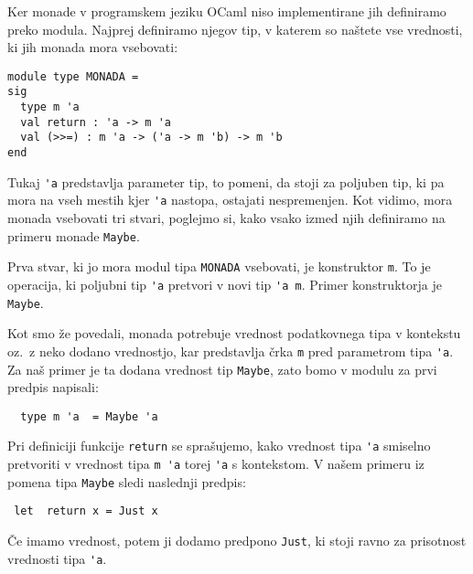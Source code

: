 \documentclass[a4paper,12pt]{article}
\theoremstyle{definition} %
\begin{document}
Ker monade v programskem jeziku OCaml niso implementirane jih definiramo preko modula. Najprej definiramo njegov tip, v katerem so naštete vse vrednosti, ki jih monada mora vsebovati:
\begin{lstlisting}
module type MONADA =
sig
  type m 'a
  val return : 'a -> m 'a
  val (>>=) : m 'a -> ('a -> m 'b) -> m 'b
end
\end{lstlisting}
Tukaj \lstinline{'a} predstavlja parameter tip, to pomeni, da stoji za poljuben tip, ki pa mora na vseh mestih kjer \lstinline{'a} nastopa, ostajati nespremenjen. Kot vidimo, mora monada vsebovati tri stvari, poglejmo si, kako vsako izmed njih definiramo na primeru monade \lstinline{Maybe}.

Prva stvar, ki jo mora modul tipa \lstinline{MONADA} vsebovati, je konstruktor \lstinline{m}. To je operacija, ki poljubni tip \lstinline{'a} pretvori v novi tip \lstinline{'a m}. Primer konstruktorja je \lstinline{Maybe}.

Kot smo že povedali, monada potrebuje vrednost podatkovnega tipa v kontekstu oz.\ z neko dodano vrednostjo, kar predstavlja črka \lstinline{m} pred parametrom tipa \lstinline{'a}. Za naš primer je ta dodana vrednost tip \lstinline{Maybe}, zato bomo v modulu za prvi predpis napisali:
\begin{lstlisting}
  type m 'a  = Maybe 'a
\end{lstlisting}
Pri definiciji funkcije \lstinline{return} se sprašujemo, kako vrednost tipa \lstinline{'a} smiselno pretvoriti v vrednost tipa \lstinline{m 'a} torej \lstinline{'a} s kontekstom. V našem primeru iz pomena tipa \lstinline{Maybe} sledi naslednji predpis:
\begin{lstlisting}
 let  return x = Just x 
\end{lstlisting}
Če imamo vrednost, potem ji dodamo predpono \lstinline{Just}, ki stoji ravno za prisotnost vrednosti tipa \lstinline{'a}.
\end{document}
